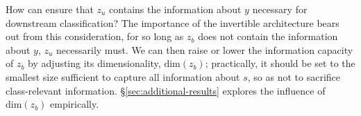 How can ensure that $z_u$ contains the information about $y$ necessary for downstream
classification?
%
The importance of the invertible architecture bears out from this consideration, for so long as
$z_b$ does not contain the information about $y$, $z_u$ necessarily must.
%
We can then raise or lower the information capacity of $z_b$ by adjusting its dimensionality, \(
\text{dim}(z_b) \); practically, it should be set to the smallest size sufficient to capture all
information about $s$, so as not to sacrifice class-relevant information. 
%
\S\ref{sec:additional-results} explores the influence of \( \mathrm{dim}(z_b) \) empirically.
%

